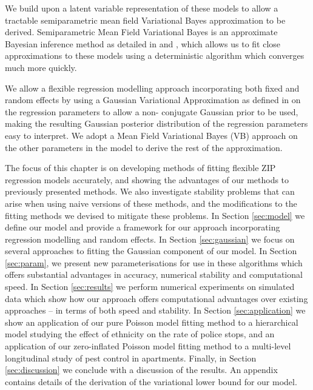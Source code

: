 We build upon a latent variable representation of these models to allow a tractable semiparametric mean field
Variational Bayes approximation to be derived. Semiparametric Mean Field Variational Bayes is an approximate
Bayesian inference method as detailed in \citep{Ormerod2010} and \citep{Rohde2015}, which allows us to fit
close approximations to these models using a deterministic  algorithm which converges much more quickly.

We allow a flexible regression modelling approach incorporating both fixed and random effects by using a
Gaussian Variational Approximation as defined in \citep{Ormerod2012} on the regression parameters to allow a
non- conjugate Gaussian prior to be used, making the resulting Gaussian posterior distribution of the
regression parameters easy to interpret. We adopt a Mean Field  Variational Bayes (VB) approach on the other
parameters in the model to derive the rest of the approximation.

The focus of this chapter is on developing methods of fitting flexible ZIP regression models accurately, and
showing the advantages of our methods to previously presented methods. We also investigate stability problems
that can arise when using naive versions of these methods, and the modifications to the fitting methods we
devised to mitigate these problems. In Section \ref{sec:model} we define our model and provide a framework for
our approach incorporating regression modelling and random effects. In Section \ref{sec:gaussian} we focus on
several approaches to fitting the Gaussian component of our model. In Section \ref{sec:param}, we present new
parameterisations for use in these algorithms which offers substantial advantages in accuracy, numerical
stability and computational speed. In Section \ref{sec:results} we perform numerical experiments on simulated
data which show how our approach offers computational advantages over existing approaches -- in terms of both
speed and stability. In Section \ref{sec:application} we show an application of our pure Poisson model fitting
method to a hierarchical model studying the effect of ethnicity on the rate of police stops, and an
application of our zero-inflated Poisson model fitting method to a multi-level longitudinal study of pest
control in apartments. Finally, in Section \ref{sec:discussion} we conclude with a discussion of the results.
An appendix contains details of the derivation of the variational lower bound for our model.

